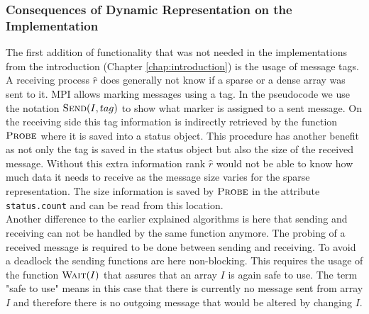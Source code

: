 \subsubsection{Consequences of Dynamic Representation on the Implementation}
The first addition of functionality that was not needed in the implementations from the introduction (Chapter \ref{chap:introduction}) is the usage of message tags. A receiving process $\hat{r}$ does generally not know if a sparse or a dense array was sent to it. MPI allows marking messages using a tag. In the pseudocode we use the notation $\Call{Send}{I, tag}$ to show what marker is assigned to a sent message. On the receiving side this tag information is indirectly retrieved by the function $\Call{Probe}{}$ where it is saved into a status object. This procedure has another benefit as not only the tag is saved in the status object but also the size of the received message. Without this extra information rank $\hat{r}$ would not be able to know how much data it needs to receive as the message size varies for the sparse representation. The size information is saved by $\Call{Probe}{}$ in the attribute \texttt{status.count} and can be read from this location.\\
Another difference to the earlier explained algorithms is here that sending and receiving can not be handled by the same function anymore. The probing of a received message is required to be done between sending and receiving. To avoid a deadlock the sending functions are here non-blocking. This requires the usage of the function $\Call{Wait}{I}$ that assures that an array $I$ is again safe to use. The term "safe to use" means in this case that there is currently no message sent from array $I$ and therefore there is no outgoing message that would be altered by changing $I$. 

